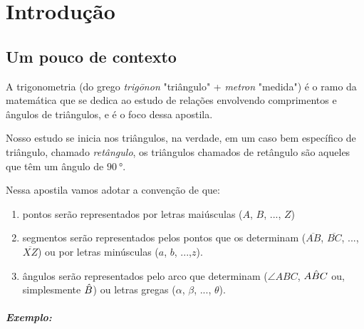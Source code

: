 \chapter{Introdução}

\section{Um pouco de contexto}
A trigonometria (do grego \textit{trigōnon} "triângulo" + \textit{metron} "medida") é o ramo da matemática que se dedica ao estudo de relações envolvendo comprimentos e ângulos de triângulos, e é o foco dessa apostila.

Nosso estudo se inicia nos triângulos, na verdade, em um caso bem específico de triângulo, chamado \textit{retângulo}, os triângulos chamados de retângulo são aqueles que têm um ângulo de $\SI{90}{\degree}$.

Nessa apostila vamos adotar a convenção de que:

\begin{enumerate}[label=(\Roman*), align=Center]
	\item pontos serão representados por letras maiúsculas ($A$, $B$, ..., $Z$)
	\item segmentos serão representados pelos pontos que os determinam ($\overline{AB}$, $\overline{BC}$, ..., $\overline{XZ}$) ou por letras minúsculas ($a$, $b$, ...,$z$).
	\item ângulos serão representados pelo arco que determinam ($\angle ABC$, $A\Hat{B}C$ ou, simplesmente $\Hat{B}$) ou letras gregas ($\alpha$, $\beta$, ..., $\theta$).
\end{enumerate}

\paragraph{Exemplo:}


